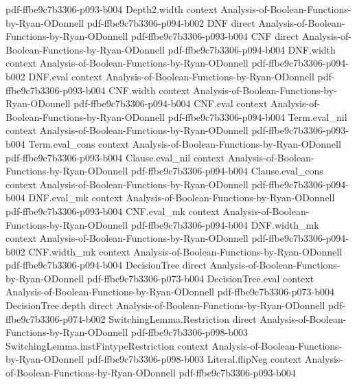 \begin{lemma}
  {pdf-ffbe9c7b3306-p093-b004}
\proofstep
  {Depth2.width}
  {context}
  {Analysis-of-Boolean-Functions-by-Ryan-ODonnell}
  {pdf-ffbe9c7b3306-p094-b002}
\proofstep
  {DNF}
  {direct}
  {Analysis-of-Boolean-Functions-by-Ryan-ODonnell}
  {pdf-ffbe9c7b3306-p093-b004}
\proofstep
  {CNF}
  {direct}
  {Analysis-of-Boolean-Functions-by-Ryan-ODonnell}
  {pdf-ffbe9c7b3306-p094-b004}
\proofstep
  {DNF.width}
  {context}
  {Analysis-of-Boolean-Functions-by-Ryan-ODonnell}
  {pdf-ffbe9c7b3306-p094-b002}
\proofstep
  {DNF.eval}
  {context}
  {Analysis-of-Boolean-Functions-by-Ryan-ODonnell}
  {pdf-ffbe9c7b3306-p093-b004}
\proofstep
  {CNF.width}
  {context}
  {Analysis-of-Boolean-Functions-by-Ryan-ODonnell}
  {pdf-ffbe9c7b3306-p094-b004}
\proofstep
  {CNF.eval}
  {context}
  {Analysis-of-Boolean-Functions-by-Ryan-ODonnell}
  {pdf-ffbe9c7b3306-p094-b004}
\proofstep
  {Term.eval_nil}
  {context}
  {Analysis-of-Boolean-Functions-by-Ryan-ODonnell}
  {pdf-ffbe9c7b3306-p093-b004}
\proofstep
  {Term.eval_cons}
  {context}
  {Analysis-of-Boolean-Functions-by-Ryan-ODonnell}
  {pdf-ffbe9c7b3306-p093-b004}
\proofstep
  {Clause.eval_nil}
  {context}
  {Analysis-of-Boolean-Functions-by-Ryan-ODonnell}
  {pdf-ffbe9c7b3306-p094-b004}
\proofstep
  {Clause.eval_cons}
  {context}
  {Analysis-of-Boolean-Functions-by-Ryan-ODonnell}
  {pdf-ffbe9c7b3306-p094-b004}
\proofstep
  {DNF.eval_mk}
  {context}
  {Analysis-of-Boolean-Functions-by-Ryan-ODonnell}
  {pdf-ffbe9c7b3306-p093-b004}
\proofstep
  {CNF.eval_mk}
  {context}
  {Analysis-of-Boolean-Functions-by-Ryan-ODonnell}
  {pdf-ffbe9c7b3306-p094-b004}
\proofstep
  {DNF.width_mk}
  {context}
  {Analysis-of-Boolean-Functions-by-Ryan-ODonnell}
  {pdf-ffbe9c7b3306-p094-b002}
\proofstep
  {CNF.width_mk}
  {context}
  {Analysis-of-Boolean-Functions-by-Ryan-ODonnell}
  {pdf-ffbe9c7b3306-p094-b004}
\proofstep
  {DecisionTree}
  {direct}
  {Analysis-of-Boolean-Functions-by-Ryan-ODonnell}
  {pdf-ffbe9c7b3306-p073-b004}
\proofstep
  {DecisionTree.eval}
  {context}
  {Analysis-of-Boolean-Functions-by-Ryan-ODonnell}
  {pdf-ffbe9c7b3306-p073-b004}
\proofstep
  {DecisionTree.depth}
  {direct}
  {Analysis-of-Boolean-Functions-by-Ryan-ODonnell}
  {pdf-ffbe9c7b3306-p074-b002}
\proofstep
  {SwitchingLemma.Restriction}
  {direct}
  {Analysis-of-Boolean-Functions-by-Ryan-ODonnell}
  {pdf-ffbe9c7b3306-p098-b003}
\proofstep
  {SwitchingLemma.instFintypeRestriction}
  {context}
  {Analysis-of-Boolean-Functions-by-Ryan-ODonnell}
  {pdf-ffbe9c7b3306-p098-b003}
\proofstep
  {Literal.flipNeg}
  {context}
  {Analysis-of-Boolean-Functions-by-Ryan-ODonnell}
  {pdf-ffbe9c7b3306-p093-b004}

\end{lemma}
